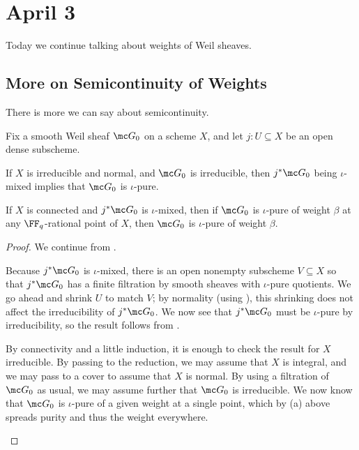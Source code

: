 \documentclass[../notes.tex]{subfiles}
\begin{document}
\section{April 3}
Today we continue talking about weights of Weil sheaves.

\subsection{More on Semicontinuity of Weights}
There is more we can say about semicontinuity.
\begin{theorem}
	Fix a smooth Weil sheaf $\mc G_0$ on a scheme $X$, and let $j\colon U\subseteq X$ be an open dense subscheme.
	\begin{listalph}
		\item If $X$ is irreducible and normal, and $\mc G_0$ is irreducible, then $j^*\mc G_0$ being $\iota$-mixed implies that $\mc G_0$ is $\iota$-pure.
		\item If $X$ is connected and $j^*\mc G_0$ is $\iota$-mixed, then if $\mc G_0$ is $\iota$-pure of weight $\beta$ at any $\FF_q$-rational point of $X$, then $\mc G_0$ is $\iota$-pure of weight $\beta$.
	\end{listalph}
\end{theorem}
\begin{proof}
	We continue from .
	\begin{listalph}
		\item Because $j^*\mc G_0$ is $\iota$-mixed, there is an open nonempty subscheme $V\subseteq X$ so that $j^*\mc G_0$ has a finite filtration by smooth sheaves with $\iota$-pure quotients. We go ahead and shrink $U$ to match $V$; by normality (using ), this shrinking does not affect the irreducibility of $j^*\mc G_0$. We now see that $j^*\mc G_0$ must be $\iota$-pure by irreducibility, so the result follows from .
		\item By connectivity and a little induction, it is enough to check the result for $X$ irreducible. By passing to the reduction, we may assume that $X$ is integral, and we may pass to a cover to assume that $X$ is normal. By using a filtration of $\mc G_0$ as usual, we may assume further that $\mc G_0$ is irreducible. We now know that $\mc G_0$ is $\iota$-pure of a given weight at a single point, which by (a) above spreads purity and thus the weight everywhere.
		\qedhere
	\end{listalph}
\end{proof}
\end{document}
